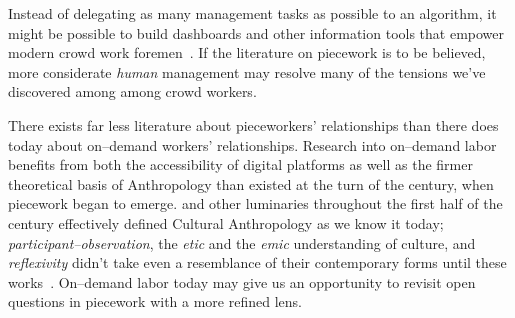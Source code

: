 \documentclass[trackingWork]{subfiles}
\begin{document}
Instead of delegating as many management tasks as possible to an algorithm,
it might be possible to build dashboards and
other information tools that empower modern crowd work foremen~\cite{kulkarni2012mobileworks}.
If the literature on piecework is to be believed,
more considerate \textit{human} management may resolve
many of the tensions we've discovered among among crowd workers.

There exists far less literature about pieceworkers' relationships than there does today about on--demand workers' relationships.
Research into on--demand labor benefits from both the accessibility of digital platforms as well as the firmer theoretical basis of Anthropology than
existed at the turn of the  century, when piecework began to emerge.
\citeauthor{malinowski2002argonauts,boas1940race,mead1973coming} and
other luminaries throughout the first half of the  century
effectively defined Cultural Anthropology as we know it today;
\textit{participant--observation},
the \textit{etic} and the \textit{emic} understanding of culture, and
\textit{reflexivity}
didn't take even a resemblance of their contemporary forms until these works~\cite{malinowski2002argonauts,boas1940race,mead1973coming}.
On--demand labor today may give us an opportunity to revisit open questions in piecework with a more refined lens.





\end{document}
